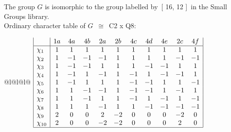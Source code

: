 \documentclass[varwidth=\maxdimen,border=10]{standalone}
\begin{document}
The group $G$ is isomorphic to the group labelled by\ [ 16, 12 ]\ in the Small Groups library.\\
Ordinary character table of $G$\ $\cong$\ C2 x Q8:\\
\begin{center}
\begin{tabular}{@{}l@{}l@{}l@{}}
\hline
\(\begin{array}{|l|cccccccccc|}
  & 1a & 4a & 4b & 2a & 2b & 4c & 4d & 4e & 2c & 4f\\ \hline
\chi_{1} & 1 & 1 & 1 & 1 & 1 & 1 & 1 & 1 & 1 & 1\\
\chi_{2} & 1 & -1 & -1 & -1 & 1 & 1 & 1 & 1 & -1 & -1\\
\chi_{3} & 1 & -1 & -1 & 1 & 1 & 1 & -1 & -1 & 1 & 1\\
\chi_{4} & 1 & -1 & 1 & -1 & 1 & -1 & 1 & -1 & -1 & 1\\
\chi_{5} & 1 & -1 & 1 & 1 & 1 & -1 & -1 & 1 & 1 & -1\\
\chi_{6} & 1 & 1 & -1 & -1 & 1 & -1 & -1 & 1 & -1 & 1\\
\chi_{7} & 1 & 1 & -1 & 1 & 1 & -1 & 1 & -1 & 1 & -1\\
\chi_{8} & 1 & 1 & 1 & -1 & 1 & 1 & -1 & -1 & -1 & -1\\
\chi_{9} & 2 & 0 & 0 & 2 & -2 & 0 & 0 & 0 & -2 & 0\\
\chi_{10} & 2 & 0 & 0 & -2 & -2 & 0 & 0 & 0 & 2 & 0\\
\hline
\end{array}\)\\
\end{tabular}
\end{center}
\end{document}
